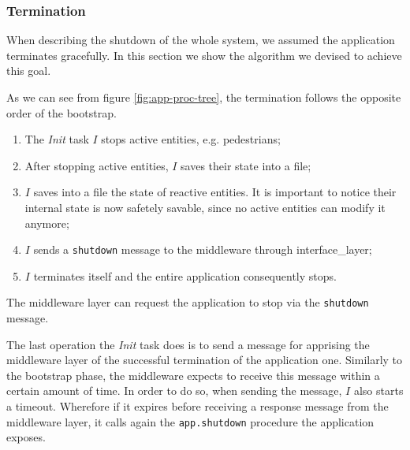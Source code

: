 \subsubsection{Termination}
When describing the shutdown of the whole system, we assumed the application
terminates gracefully.
In this section we show the algorithm we devised to achieve this goal.

As we can see from figure \ref{fig:app-proc-tree}, the termination follows the
opposite order of the bootstrap.

\begin{enumerate}
  \item The \textit{Init} task $I$ stops active entities, e.g. pedestrians;
  \item After stopping active entities, $I$ saves their state into a file;
  \item $I$ saves into a file the state of reactive entities.
  It is important to notice their internal state is now safetely savable,
  since no active entities can modify it anymore;
  \item $I$ sends a \texttt{shutdown} message to the middleware through
  interface\_layer;
  \item $I$ terminates itself and the entire application consequently stops.
\end{enumerate}

The middleware layer can request the application to stop via the
\texttt{shutdown} message.

The last operation the \textit{Init} task does is to send a message for apprising
the middleware layer of the successful termination of the application one.
Similarly to the bootstrap phase, the middleware expects to receive this
message within a certain amount of time.
In order to do so, when sending the message, $I$ also starts a timeout.
Wherefore if it expires before receiving a response message from the middleware layer,
it calls again the \texttt{app.shutdown} procedure the application exposes.
